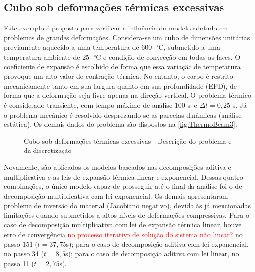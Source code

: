 \documentclass[Tese.tex]{subfiles}
\begin{document}
\subsection{Cubo sob deformações térmicas excessivas}\label{subsec:thermoCube2}

Este exemplo é proposto para verificar a influência do modelo adotado em problemas de grandes deformações. Considera-se um cubo de dimensões unitárias previamente aquecido a uma temperatura de $600\text{ }^{\circ}$C, submetido a uma temperatura ambiente de $25\text{ }^{\circ}$C e condição de convecção em todas as faces. O coeficiente de expansão é escolhido de forma que essa variação de temperatura provoque um alto valor de contração térmica. No entanto, o corpo é restrito mecanicamente tanto em sua largura quanto em sua profundidade (EPD), de forma que a deformação seja livre apenas na direção vertical. O problema térmico é considerado transiente, com tempo máximo de análise $100$ s, e $\Delta t = 0,25$ s. Já o problema mecânico é resolvido desprezando-se as parcelas dinâmicas (análise estática). Os demais dados do problema são dispostos na \autoref{fig:ThermoBeam3}.

\begin{figure}[!htb]
	\centering
	\caption{Cubo sob deformações térmicas excessivas - Descrição do problema e da discretização}
	\label{fig:ThermoBeam3}
	{\small
		\noindent{}
	}	
\end{figure}

Novamente, são aplicados os modelos baseados nas decomposições aditiva e multiplicativa e as leis de expansão térmica linear e exponencial. Dessas quatro combinações, o único modelo capaz de prosseguir até o final da análise foi o de decomposição multiplicativa com lei exponencial. Os demais apresentaram problema de inversão do material (Jacobiano negativo), devido às já mencionadas limitações quando submetidos a altos níveis de deformações compressivas. Para o caso de decomposição multiplicativa com lei de expansão térmica linear, houve erro de convergência \textcolor{red}{no processo iterativo de solução do sistema não linear?} no passo $151$ ($t=37,75$s); para o caso de decomposição aditiva com lei exponencial, no passo 34 ($t=8,5$s); para o caso de decomposição aditiva com lei linear, no passo 11 ($t=2,75$s).
\end{document}
